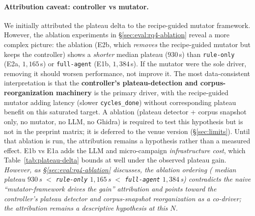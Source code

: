 \documentclass[11pt]{article}
\begin{document}
\paragraph{Attribution caveat: controller vs mutator.}
We initially attributed the plateau delta to the recipe-guided
mutator framework. However, the ablation experiments in
\S\ref{sec:eval:rq4-ablation} reveal a more complex picture: the
 ablation (E2b, which \emph{removes} the
recipe-guided mutator but keeps the controller) shows a
\emph{shorter} median plateau ($930$\,s) than \texttt{rule-only}
(E2a, $1{,}165$\,s) or \texttt{full-agent} (E1b, $1{,}384$\,s). If
the mutator were the sole driver, removing it should worsen
performance, not improve it. The most data-consistent interpretation
is that the \textbf{controller's plateau-detection and
corpus-reorganization machinery} is the primary driver, with the
recipe-guided mutator adding latency (slower \texttt{cycles\_done})
without corresponding plateau benefit on this saturated target. A
 ablation (plateau detector + corpus snapshot
only, no mutator, no LLM, no Ghidra) is required to test this
hypothesis but is not in the preprint matrix; it is deferred to the
venue version (\S\ref{sec:limits}). Until that ablation is run, the
attribution remains a hypothesis rather than a measured effect.
E1b vs E1a adds the LLM and micro-campaign \emph{infrastructure
cost}, which Table~\ref{tab:plateau-delta} bounds at well under
the observed plateau gain. \emph{However, as
\S\ref{sec:eval:rq4-ablation} discusses, the ablation ordering
( median plateau $930$\,s $<$ \texttt{rule-only}
$1{,}165$\,s $<$ \texttt{full-agent} $1{,}384$\,s) contradicts the
naive ``mutator-framework drives the gain'' attribution and points
toward the controller's plateau detector and corpus-snapshot
reorganization as a co-driver; the attribution remains a
descriptive hypothesis at this $N$.}
\end{document}

